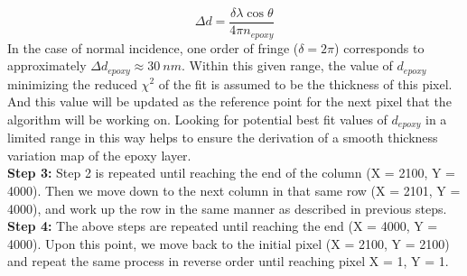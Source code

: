 \documentclass[twocolumn]{aastex63} %
\begin{document}
\begin{CJK*}{UTF8}{gbsn}
\begin{equation} \label{eq:thickness2forder}
    \Delta d = \frac{\delta \lambda \cos{\theta}}{4\pi n_{epoxy}}
\end{equation}
In the case of normal incidence, one order of fringe ($\delta = 2\pi$) corresponds to approximately $\Delta d_{epoxy} \approx 30\ nm$.
Within this given range, the value of $d_{epoxy}$ minimizing the reduced $\chi^2$ of the fit is assumed to be the thickness of this pixel. And this value will be updated as the reference point for the next pixel that the algorithm will be working on. Looking for potential best fit values of $d_{epoxy}$ in a limited range in this way helps to ensure the derivation of a smooth thickness variation map of the epoxy layer.\\
\textbf{Step 3:} Step 2 is repeated until reaching the end of the column (X = 2100, Y = 4000). Then we move down to the next column in that same row (X = 2101, Y = 4000), and work up the row in the same manner as described in previous steps. \\
\textbf{Step 4:} The above steps are repeated until reaching the end (X = 4000, Y = 4000). Upon this point, we move back to the initial pixel (X = 2100, Y = 2100) and repeat the same process in reverse order until reaching pixel X = 1, Y = 1. 



\end{CJK*}
\end{document}
